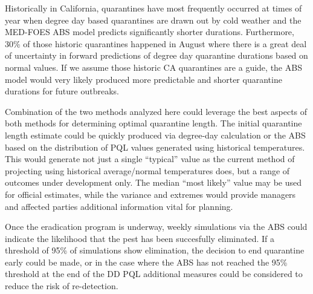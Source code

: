 \documentclass[10pt,a4paper,twocolumn]{article}
\begin{document}
Historically in California, quarantines have most frequently occurred at times of year when 
degree day based quarantines are drawn out by cold weather and the MED-FOES ABS model predicts significantly
shorter durations.
Furthermore, 30\% of those historic quarantines happened in August where there is a great 
deal of uncertainty in forward predictions of degree day quarantine durations based on normal values.
If we assume those historic CA quarantines are a guide, the ABS model would very likely
produced more predictable and shorter quarantine durations for future outbreaks.




Combination of the two methods analyzed here could leverage the best aspects of both methods for 
determining optimal quarantine length. 
The initial quarantine length estimate could be quickly produced via degree-day calculation
or the ABS
based on the distribution of PQL values generated using historical temperatures.
This would generate not just a single ``typical'' value as the current method of projecting
using historical average/normal temperatures does, but a range of outcomes under development only.
The median ``most likely'' value may be used for official estimates, while
the variance and extremes would provide managers and affected parties additional
information vital for planning.

Once the eradication program is underway, weekly simulations
via the ABS could indicate the likelihood that the pest has been succesfully eliminated.
If a threshold of 95\% of simulations show elimination, 
the decision to end quarantine early could be made, 
or in the case where the ABS has not reached the 95\% threshold at the end of the DD PQL 
additional measures could be considered to reduce the risk of re-detection.
\end{document}
